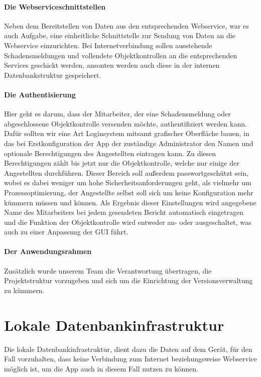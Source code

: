 \documentclass[12pt]{article}
\begin{document}
\paragraph{Die Webserviceschnittstellen} Neben dem Bereitstellen von Daten aus den entsprechenden Webservice, war es auch Aufgabe, eine einheitliche Schnittstelle zur Sendung von Daten an die Webservice einzurichten. Bei Internetverbindung sollen ausstehende Schadensmeldungen und vollendete Objektkontrollen an die entsprechenden Services geschickt werden, ansonten werden auch diese in der internen Datenbankstruktur gespeichert.
\paragraph{Die Authentisierung} Hier geht es darum, dass der Mitarbeiter, der eine Schadensmeldung oder abgeschlossene Objektkontrolle versenden möchte, authentifiziert werden kann. Dafür sollten wir eine Art Loginsystem mitsamt grafischer Oberfläche bauen, in das bei Erstkonfiguration der App der zuständige Administrator den Namen und optionale Berechtigungen des Angestellten eintragen kann. Zu diesen Berechtigungen zählt bis jetzt nur die Objektkontrolle, welche nur einige der Angestellten durchführen. Dieser Bereich soll außerdem passwortgeschützt sein, wobei es dabei weniger um hohe Sicherheitsanforderungen geht, als vielmehr um Prozessoptimierung, der Angestellte selbst soll sich um keine Konfiguration mehr kümmern müssen und können. Als Ergebnis dieser Einstellungen wird angegebene Name des Mitarbeiters bei jedem gesendeten Bericht automatisch eingetragen und die Funktion der Objektkontrolle wird entweder an- oder ausgeschaltet, was auch zu einer Anpassung der GUI führt.
\paragraph{Der Anwendungsrahmen} Zusätzlich wurde unserem Team die Verantwortung übertragen, die Projektstruktur vorzugeben und sich um die Einrichtung der Versionsverwaltung zu kümmern.

\newpage
\section{Lokale Datenbankinfrastruktur}
Die lokale Datenbankinfrastruktur, dient dazu die Daten auf dem Gerät, für den Fall vorzuhalten, dass keine Verbindung zum Internet beziehungsweise Webservice möglich ist, um die App auch in diesem Fall nutzen zu können.
\end{document}
